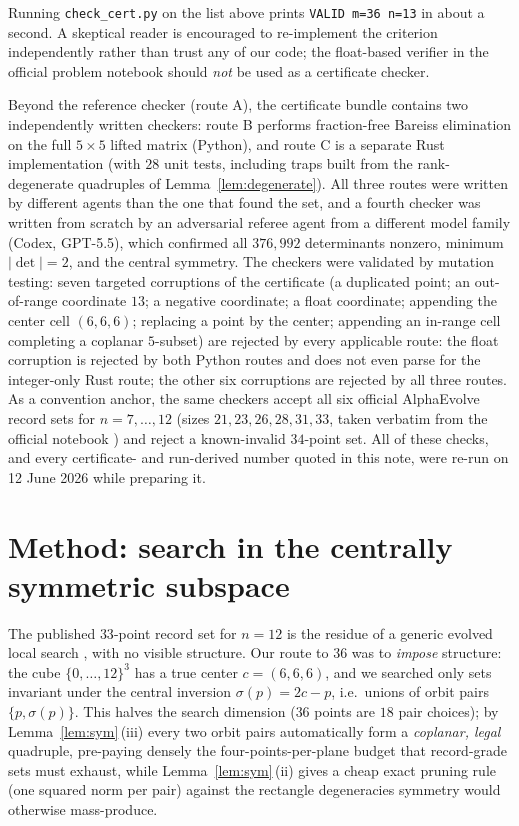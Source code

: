 \documentclass[10pt]{article}
\theoremstyle{remark}
\begin{document}
\noindent
Running \texttt{check\_cert.py} on the list above prints
\texttt{VALID m=36 n=13} in about a second. A skeptical reader is encouraged to re-implement the criterion
independently rather than trust any of our code; the float-based verifier
in the official problem notebook \cite{Repo} should \emph{not} be used as a
certificate checker.

Beyond the reference checker (route A), the certificate bundle contains two
independently written checkers: route B performs fraction-free Bareiss
elimination on the full $5\times 5$ lifted matrix (Python), and route C is a
separate Rust implementation (with $28$ unit tests, including traps built
from the rank-degenerate quadruples of Lemma~\ref{lem:degenerate}). All
three routes were written by different agents than the one that found the
set, and a fourth checker was written from scratch by an adversarial referee
agent from a different model family (Codex, GPT-5.5), which confirmed all
$376{,}992$ determinants nonzero, minimum $|\det| = 2$, and the central
symmetry. The checkers were validated by mutation testing: seven targeted
corruptions of the certificate (a duplicated point; an out-of-range
coordinate $13$; a negative coordinate; a float coordinate; appending the
center cell $(6,6,6)$; replacing a point by the center; appending an
in-range cell completing a coplanar $5$-subset) are rejected by every
applicable route: the float corruption is rejected by both Python routes and
does not even parse for the integer-only Rust route; the other six
corruptions are rejected by all three routes. As a convention anchor, the
same checkers accept all six official
AlphaEvolve record sets for $n = 7,\dots,12$ (sizes $21, 23, 26, 28, 31,
33$, taken verbatim from the official notebook \cite{Repo}) and reject a
known-invalid $34$-point set. All of these checks, and every
certificate- and run-derived number quoted
in this note, were re-run on 12 June 2026 while preparing it.

\section{Method: search in the centrally symmetric subspace}\label{sec:method}

The published $33$-point record set for $n = 12$ is the residue of a generic
evolved local search \cite[Problem~6.60]{AlphaEvolveMath}, with no visible
structure. Our route to $36$ was to \emph{impose} structure: the cube
$\{0,\dots,12\}^3$ has a true center $c = (6,6,6)$, and we searched only
sets invariant under the central inversion $\sigma(p) = 2c - p$, i.e.\
unions of orbit pairs $\{p, \sigma(p)\}$. This halves the search dimension
($36$ points are $18$ pair choices); by Lemma~\ref{lem:sym}\,(iii) every two
orbit pairs automatically form a \emph{coplanar, legal} quadruple,
pre-paying densely the four-points-per-plane budget that record-grade sets
must exhaust, while Lemma~\ref{lem:sym}\,(ii) gives a cheap exact pruning
rule (one squared norm per pair) against the rectangle degeneracies
symmetry would otherwise mass-produce.
\end{document}
